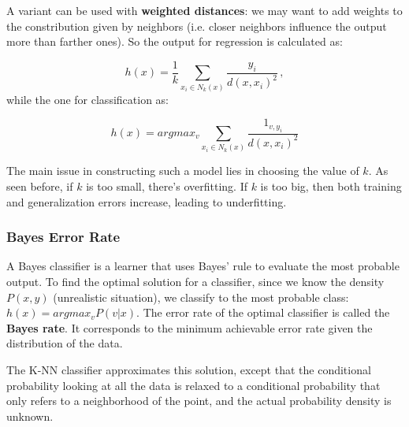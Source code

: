 A variant can be used with \textbf{weighted distances}: we may want to add weights to the constribution given by neighbors (i.e. closer neighbors influence the output more than farther ones). So the output for regression is calculated as:

\begin{equation*}
    h(x) = \frac{1}{k}\sum_{x_i \in N_k(x)} \dfrac{y_i}{d(x,x_i)^2} \, ,
\end{equation*}
while the one for classification as:

\begin{equation*}
    h(x) = argmax_v \sum_{x_i \in N_k(x)}  \dfrac{1_{v,y_i}}{d(x,x_i)^2}
\end{equation*}

The main issue in constructing such a model lies in choosing the value of $k$. As seen before, if $k$ is too small, there's overfitting. If $k$ is too big, then both training and generalization errors increase, leading to underfitting.

\subsubsection{Bayes Error Rate}
A Bayes classifier is a learner that uses Bayes' rule to evaluate the most probable output. To find the optimal solution for a classifier, since we know the density $P(x,y)$ (unrealistic situation), we classify to the most probable class: $h(x) = argmax_v P(v|x)$. The error rate of the optimal classifier is called the \textbf{Bayes rate}. It corresponds to the minimum achievable error rate given the distribution of the data.

The K-NN classifier approximates this solution, except that the conditional probability looking at all the data is relaxed to a conditional probability that only refers to a neighborhood of the point, and the actual probability density is unknown.

